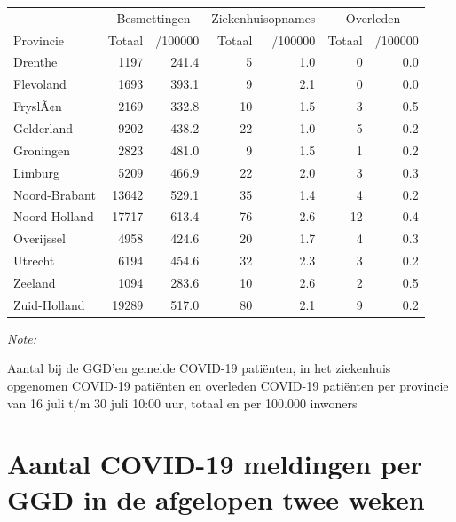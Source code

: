 \documentclass[
  english,
  man,floatsintext]{apa6}
\begin{document}
\begin{table}
\centering
\begin{threeparttable}
\begin{tabular}{lrrrrrr}
\toprule
\multicolumn{1}{c}{ } & \multicolumn{2}{c}{Besmettingen} & \multicolumn{2}{c}{Ziekenhuisopnames} & \multicolumn{2}{c}{Overleden} \\
\cmidrule(l{3pt}r{3pt}){2-3} \cmidrule(l{3pt}r{3pt}){4-5} \cmidrule(l{3pt}r{3pt}){6-7}
Provincie & Totaal & /100000 & Totaal & /100000 & Totaal & /100000\\
\midrule
Drenthe & 1197 & 241.4 & 5 & 1.0 & 0 & 0.0\\
Flevoland & 1693 & 393.1 & 9 & 2.1 & 0 & 0.0\\
FryslÃ¢n & 2169 & 332.8 & 10 & 1.5 & 3 & 0.5\\
Gelderland & 9202 & 438.2 & 22 & 1.0 & 5 & 0.2\\
Groningen & 2823 & 481.0 & 9 & 1.5 & 1 & 0.2\\
Limburg & 5209 & 466.9 & 22 & 2.0 & 3 & 0.3\\
Noord-Brabant & 13642 & 529.1 & 35 & 1.4 & 4 & 0.2\\
Noord-Holland & 17717 & 613.4 & 76 & 2.6 & 12 & 0.4\\
Overijssel & 4958 & 424.6 & 20 & 1.7 & 4 & 0.3\\
Utrecht & 6194 & 454.6 & 32 & 2.3 & 3 & 0.2\\
Zeeland & 1094 & 283.6 & 10 & 2.6 & 2 & 0.5\\
Zuid-Holland & 19289 & 517.0 & 80 & 2.1 & 9 & 0.2\\
\bottomrule
\end{tabular}
\begin{tablenotes}
\item \textit{Note: } 
\item Aantal bij de GGD’en gemelde COVID-19 patiënten, in het ziekenhuis opgenomen COVID-19 patiënten en overleden COVID-19 patiënten per provincie van 16 juli t/m 30 juli 10:00 uur, totaal en per 100.000 inwoners
\end{tablenotes}
\end{threeparttable}
\end{table}

\newpage

\hypertarget{aantal-covid-19-meldingen-per-ggd-in-de-afgelopen-twee-weken}{%
\section{Aantal COVID-19 meldingen per GGD in de afgelopen twee weken}\label{aantal-covid-19-meldingen-per-ggd-in-de-afgelopen-twee-weken}}
\end{document}
